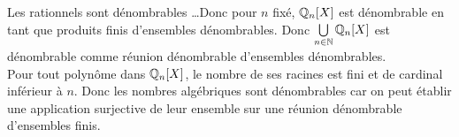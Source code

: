 \begin{solution}
Les rationnels sont dénombrables \dots \note Donc pour $n$ fixé, $\mathbb{Q}_n[X]$ est dénombrable en tant que produits finis d'ensembles dénombrables.
Donc $\bigcup\limits_{n \in \mathbb{N}} \mathbb{Q}_n[X]$ est dénombrable comme réunion dénombrable d'ensembles dénombrables. \\
Pour tout polynôme dans $\mathbb{Q}_n[X]$, le nombre de ses racines est fini et de cardinal inférieur à $n$. 
Donc les nombres algébriques sont dénombrables car on peut établir une application surjective de leur ensemble sur une réunion dénombrable d'ensembles finis. 
\end{solution}